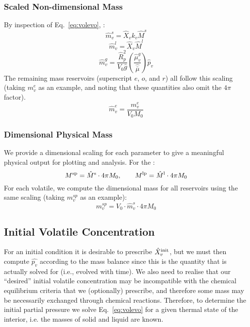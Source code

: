 \subsubsection{Scaled Non-dimensional Mass}
By inspection of Eq.~\ref{eq:volevo}, :
\begin{equation}
\hat{m}_v^s = \hat{X}_v k_v \hat{M}^s
\end{equation}
\begin{equation}
\hat{m}_v^l = \hat{X}_v \hat{M}^l
\end{equation}
\begin{equation}
\hat{m}_v^g = \frac{\hat{R}_p^2}{V_0 \hat{g}} \left( \frac{\hat{\mu}_v^g}{\hat{\bar{\mu}}} \right) \hat{p}_v
\end{equation}
The remaining mass reservoirs (superscript $e$, $o$, and $r$) all follow this scaling (taking $m_v^e$ as an example, and noting that these quantities also omit the $4 \pi$ factor).
\begin{equation}
\hat{m}_v^e = \frac{m_v^e}{V_0 M_0}
\end{equation}
\subsubsection{Dimensional Physical Mass}
We provide a dimensional scaling for each parameter to give a meaningful physical output for plotting and analysis.  For the :
\begin{equation}
M^{\rm sp} = \hat{M}^{\rm s} \cdot 4 \pi M_0, \qquad M^{\rm lp} = \hat{M}^{\rm l} \cdot 4 \pi M_0
\end{equation}
For each volatile, we compute the dimensional mass for all reservoirs using the same scaling (taking $m_v^{sp}$ as an example):
\begin{equation}
m_v^{sp} = V_0 \cdot \hat{m}_v^s \cdot 4 \pi M_0
\end{equation}
\subsection{Initial Volatile Concentration}
For an initial condition it is desirable to prescribe $\hat{X}_v^{\rm init}$, but we must then compute $\hat{p_v}$ according to the mass balance since this is the quantity that is actually solved for (i.e., evolved with time).  We also need to realise that our ``desired'' initial volatile concentration may be incompatible with the chemical equilibrium criteria that we (optionally) prescribe, and therefore some mass may be necessarily exchanged through chemical reactions.  Therefore, to determine the initial partial pressure we solve Eq.~\ref{eq:volevo} for a given thermal state of the interior, i.e. the masses of solid and liquid are known.

